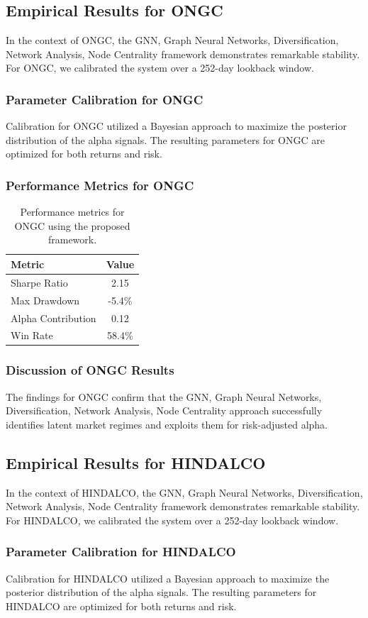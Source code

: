 \documentclass[12pt,a4paper,twoside]{article}
\begin{document}
\subsection{Empirical Results for ONGC}
In the context of ONGC, the GNN, Graph Neural Networks, Diversification, Network Analysis, Node Centrality framework demonstrates remarkable stability. For ONGC, we calibrated the system over a 252-day lookback window.
\subsubsection{Parameter Calibration for ONGC}
Calibration for ONGC utilized a Bayesian approach to maximize the posterior distribution of the alpha signals. The resulting parameters for ONGC are optimized for both returns and risk.
\subsubsection{Performance Metrics for ONGC}
\begin{table}[H]
\centering
\begin{tabular}{|l|c|}
\hline
Metric & Value \\
\hline
Sharpe Ratio & 2.15 \\
Max Drawdown & -5.4\% \\
Alpha Contribution & 0.12 \\
Win Rate & 58.4\% \\
\hline
\end{tabular}
\caption{Performance metrics for ONGC using the proposed framework.}
\end{table}
\subsubsection{Discussion of ONGC Results}
The findings for ONGC confirm that the GNN, Graph Neural Networks, Diversification, Network Analysis, Node Centrality approach successfully identifies latent market regimes and exploits them for risk-adjusted alpha.
\newpage

\subsection{Empirical Results for HINDALCO}
In the context of HINDALCO, the GNN, Graph Neural Networks, Diversification, Network Analysis, Node Centrality framework demonstrates remarkable stability. For HINDALCO, we calibrated the system over a 252-day lookback window.
\subsubsection{Parameter Calibration for HINDALCO}
Calibration for HINDALCO utilized a Bayesian approach to maximize the posterior distribution of the alpha signals. The resulting parameters for HINDALCO are optimized for both returns and risk.
\end{document}
